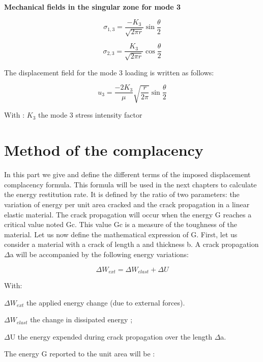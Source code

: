 \smallskip

\textbf{Mechanical fields in the singular zone for mode 3}

\begin{equation}
	\sigma_{1,3} = \frac{-K_{3}}{\sqrt{2 \pi r}} \sin{\frac{\theta}{2}}
\end{equation}

\begin{equation}
	\sigma_{2,3} = \frac{K_{3}}{\sqrt{2 \pi r}} \cos{\frac{\theta}{2}}
\end{equation}

The displacement field for the mode 3 loading is written as follows:

\begin{equation}
	u_{3} = \frac{-2 K_{3}}{\mu} \sqrt{\frac{r}{2 \pi}} \sin{\frac{\theta}{2}}
\end{equation}

With : $K_3$  the mode 3 stress intensity factor

\section{Method of the complacency}

In this part we give and define the different terms of the imposed displacement complacency formula. This formula will be used in the next chapters to calculate the energy restitution rate. It is defined by the ratio of two parameters: the variation of energy per unit area cracked and the crack propagation in a linear elastic material. The crack propagation will occur when the energy G reaches a critical value noted Gc. This value Gc is a measure of the toughness of the material. Let us now define the mathematical expression of G. First, let us consider a material with a crack of length a and thickness b. A crack propagation $\Delta$a will be accompanied by the following energy variations:

\begin{equation}
	\Delta W_{ext}=\Delta W_{elast}+\Delta U
\end{equation}

With:

$\Delta W_{ext}$ the applied energy change (due to external forces).

$\Delta W_{elast}$ the change in dissipated energy ;

$\Delta$U the energy expended during crack propagation over the length $\Delta$a.

The energy G reported to the unit area will be :

